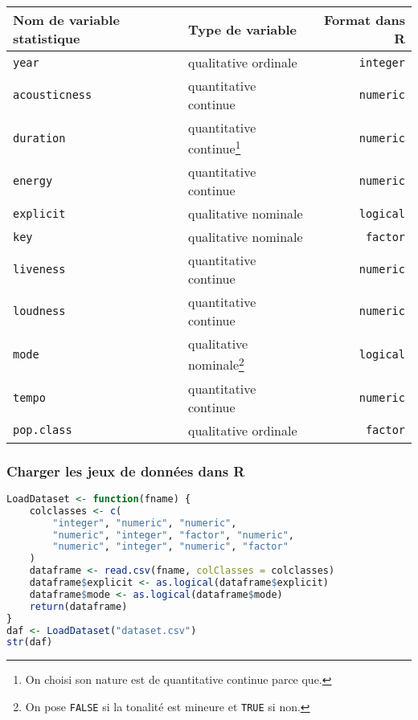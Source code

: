 \documentclass[
  12pt,
  xcolor = usenames,dvipsnames]{article}
\newcommand{\passthrough}[1]{#1}
\begin{document}
\begin{longtable}[]{@{}llr@{}}
\toprule
Nom de variable statistique & Type de variable & Format dans R \\
\midrule
\endhead
\passthrough{\lstinline!year!} & qualitative ordinale &
\passthrough{\lstinline!integer!} \\
\passthrough{\lstinline!acousticness!} & quantitative continue &
\passthrough{\lstinline!numeric!} \\
\passthrough{\lstinline!duration!} & quantitative continue\footnote{On
  choisi son nature est de quantitative continue parce que.} &
\passthrough{\lstinline!numeric!} \\
\passthrough{\lstinline!energy!} & quantitative continue &
\passthrough{\lstinline!numeric!} \\
\passthrough{\lstinline!explicit!} & qualitative nominale &
\passthrough{\lstinline!logical!} \\
\passthrough{\lstinline!key!} & qualitative nominale &
\passthrough{\lstinline!factor!} \\
\passthrough{\lstinline!liveness!} & quantitative continue &
\passthrough{\lstinline!numeric!} \\
\passthrough{\lstinline!loudness!} & quantitative continue &
\passthrough{\lstinline!numeric!} \\
\passthrough{\lstinline!mode!} & qualitative nominale\footnote{On pose
  \passthrough{\lstinline!FALSE!} si la tonalité est mineure et
  \passthrough{\lstinline!TRUE!} si non.} &
\passthrough{\lstinline!logical!} \\
\passthrough{\lstinline!tempo!} & quantitative continue &
\passthrough{\lstinline!numeric!} \\
\passthrough{\lstinline!pop.class!} & qualitative ordinale &
\passthrough{\lstinline!factor!} \\
\bottomrule
\end{longtable}

\hypertarget{charger-les-jeux-de-donnuxe9es-dans-r}{%
\subsubsection{Charger les jeux de données dans
R}\label{charger-les-jeux-de-donnuxe9es-dans-r}}

\begin{lstlisting}[language=R]
LoadDataset <- function(fname) {
    colclasses <- c(
        "integer", "numeric", "numeric",
        "numeric", "integer", "factor", "numeric",
        "numeric", "integer", "numeric", "factor"
    )
    dataframe <- read.csv(fname, colClasses = colclasses)
    dataframe$explicit <- as.logical(dataframe$explicit)
    dataframe$mode <- as.logical(dataframe$mode)
    return(dataframe)
}
daf <- LoadDataset("dataset.csv")
str(daf)
\end{lstlisting}
\end{document}
